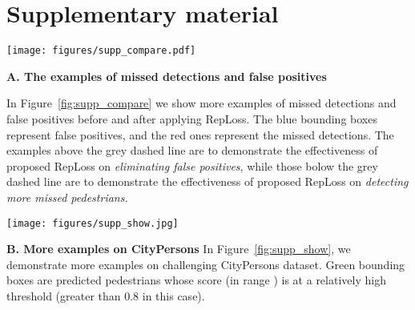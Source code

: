 \documentclass[10pt,twocolumn,letterpaper]{article}
\begin{document}
{\small


}

{\small


}

\clearpage

\part*{Supplementary material}

\begin{figure*}[!tbp]
\centering
\texttt{[image: figures/supp\_compare.pdf]}
\caption{Comparison of baseline and RepLoss. The blue bounding boxes represent false positives, and the red ones represent the missed detections. On two sides of the grey dashed line, samples on the first row of each side are predictions of our baseline, while samples on the second row of each side are the predictions after adding the RepLoss.}
\label{fig:supp_compare}
\end{figure*}

\textbf{A. The examples of missed detections and false positives} 

In Figure~\ref{fig:supp_compare} we show more examples of missed detections and false positives before and after applying RepLoss. The blue bounding boxes represent false positives, and the red ones represent the missed detections. The examples above the grey dashed line are to demonstrate the effectiveness of proposed RepLoss on {\it eliminating false positives}, while those bolow the grey dashed line are to demonstrate the effectiveness of proposed RepLoss on {\it detecting more missed pedestrians.}
\par

\begin{figure*}
\centering
\texttt{[image: figures/supp\_show.jpg]}
\caption{More examples on CityPersons dataset. Green bounding boxes are predicted pedestrians whose score ([0, 1.0]) is greater than 0.8.}
\label{fig:supp_show}
\end{figure*}

\textbf{B. More examples on CityPersons}
In Figure~\ref{fig:supp_show}, we demonstrate more examples on challenging CityPersons dataset. Green bounding boxes are predicted pedestrians whose score (in range ) is at a relatively high threshold (greater than 0.8 in this case).
\end{document}
